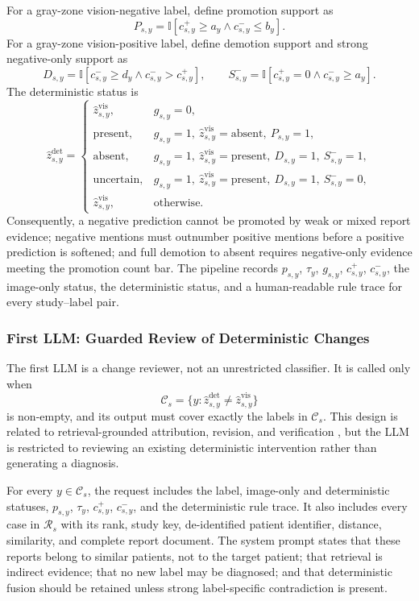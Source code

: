 For a gray-zone vision-negative label, define promotion support as
\[
P_{s,y}=\mathbb I[c^+_{s,y}\geq a_y\land c^-_{s,y}\leq b_y].
\]
For a gray-zone vision-positive label, define demotion support and strong negative-only support as
\[
D_{s,y}=\mathbb I[c^-_{s,y}\geq d_y\land c^-_{s,y}>c^+_{s,y}],
\qquad
S^-_{s,y}=\mathbb I[c^+_{s,y}=0\land c^-_{s,y}\geq a_y].
\]
The deterministic status is
\[
\widehat z^{\mathrm{det}}_{s,y}=
\begin{cases}
\widehat z^{\mathrm{vis}}_{s,y},
& g_{s,y}=0,\\
\mathrm{present},
& g_{s,y}=1,\ \widehat z^{\mathrm{vis}}_{s,y}=\mathrm{absent},\ P_{s,y}=1,\\
\mathrm{absent},
& g_{s,y}=1,\ \widehat z^{\mathrm{vis}}_{s,y}=\mathrm{present},\ D_{s,y}=1,\ S^-_{s,y}=1,\\
\mathrm{uncertain},
& g_{s,y}=1,\ \widehat z^{\mathrm{vis}}_{s,y}=\mathrm{present},\ D_{s,y}=1,\ S^-_{s,y}=0,\\
\widehat z^{\mathrm{vis}}_{s,y},
& \text{otherwise}.
\end{cases}
\]
Consequently, a negative prediction cannot be promoted by weak or mixed report evidence; negative mentions must outnumber positive mentions before a positive prediction is softened; and full demotion to absent requires negative-only evidence meeting the promotion count bar. The pipeline records $p_{s,y}$, $\tau_y$, $g_{s,y}$, $c^+_{s,y}$, $c^-_{s,y}$, the image-only status, the deterministic status, and a human-readable rule trace for every study--label pair.

\subsubsection{First LLM: Guarded Review of Deterministic Changes}

The first LLM is a change reviewer, not an unrestricted classifier. It is called only when
\[
\mathcal C_s=
\{y:\widehat z^{\mathrm{det}}_{s,y}\neq\widehat z^{\mathrm{vis}}_{s,y}\}
\]
is non-empty, and its output must cover exactly the labels in $\mathcal C_s$. This design is related to retrieval-grounded attribution, revision, and verification \cite{gao2023rarr,dhuliawala2024chain,min2023factscore}, but the LLM is restricted to reviewing an existing deterministic intervention rather than generating a diagnosis.

For every $y\in\mathcal C_s$, the request includes the label, image-only and deterministic statuses, $p_{s,y}$, $\tau_y$, $c^+_{s,y}$, $c^-_{s,y}$, and the deterministic rule trace. It also includes every case in $\mathcal R_s$ with its rank, study key, de-identified patient identifier, distance, similarity, and complete report document. The system prompt states that these reports belong to similar patients, not to the target patient; that retrieval is indirect evidence; that no new label may be diagnosed; and that deterministic fusion should be retained unless strong label-specific contradiction is present.

